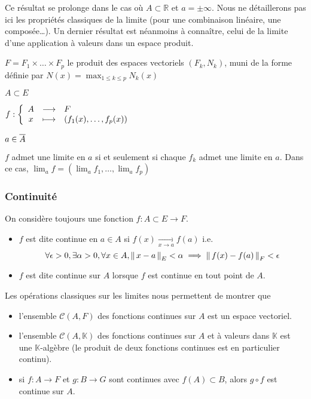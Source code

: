     Ce résultat se prolonge dans le cas où $A \subset \mathbb{R}$ et $a = \pm \infty$. Nous ne détaillerons pas ici les propriétés classiques de la limite (pour une combinaison linéaire, une composée\ldots). Un dernier résultat est néanmoins à connaître, celui de la limite d’une application à valeurs dans un espace produit.

    \begin{prop}{}{}
        \begin{soient}
            \item $F = F_1 \times \ldots \times F_p$ le produit des espaces vectoriels $(F_k, N_k)$, muni de la forme définie par $N(x) = \max_{1 \leq k \leq p} N_k(x)$
            \item $A \subset E$
            \item $\fonction{f}{A}{F}{x}{\left(f_1(x), \ldots, f_p(x)\right)}$
            \item $a \in \overline{A}$
        \end{soient}
        $f$ admet une limite en $a$ si et seulement si chaque $f_k$ admet une limite en $a$. Dans ce cas, $\lim_a f = \left(\lim_a f_1,\ldots, \lim_a f_p\right)$
    \end{prop}

    \subsubsection{Continuité}

    On considère toujours une fonction $f : A \subset E \rightarrow F$.

    \begin{defi}{}{}
        \begin{itemize}
            \item $f$ est dite continue en $a \in A$ si $f(x) \underset{x \rightarrow a}{\longrightarrow} f(a)$ i.e.
            \[ \forall \epsilon > 0, \exists \alpha > 0, \forall x \in A, \left\lVert\,x-a\,\right\rVert_E < \alpha \implies \left\lVert\,f(x) - f(a)\,\right\rVert_F < \epsilon \]
            \item $f$ est dite continue sur $A$ lorsque $f$ est continue en tout point de $A$.
        \end{itemize}
    \end{defi}

    Les opérations classiques sur les limites nous permettent de montrer que 
    \begin{itemize}
        \item l’ensemble $\mathcal{C}(A,F)$ des fonctions continues sur $A$ est un espace vectoriel.
        \item l’ensemble $\mathcal{C}(A,\mathbb{K})$ des fonctions continues sur $A$ et à valeurs dans $\mathbb{K}$ est une $\mathbb{K}$-algèbre (le produit de deux fonctions continues est en particulier continu).
        \item si $f : A \rightarrow F$ et $g : B \rightarrow G$ sont continues avec $f(A) \subset B$, alors $g \circ f$ est continue sur $A$.
    \end{itemize}

